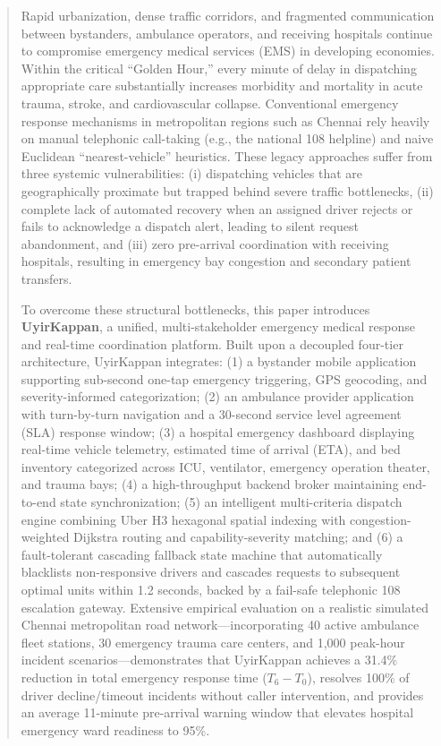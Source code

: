 \documentclass[conference]{IEEEtran}
\begin{document}
\begin{abstract}
Rapid urbanization, dense traffic corridors, and fragmented communication between bystanders, ambulance operators, and receiving hospitals continue to compromise emergency medical services (EMS) in developing economies. Within the critical ``Golden Hour,'' every minute of delay in dispatching appropriate care substantially increases morbidity and mortality in acute trauma, stroke, and cardiovascular collapse. Conventional emergency response mechanisms in metropolitan regions such as Chennai rely heavily on manual telephonic call-taking (e.g., the national 108 helpline) and naive Euclidean ``nearest-vehicle'' heuristics. These legacy approaches suffer from three systemic vulnerabilities: (i) dispatching vehicles that are geographically proximate but trapped behind severe traffic bottlenecks, (ii) complete lack of automated recovery when an assigned driver rejects or fails to acknowledge a dispatch alert, leading to silent request abandonment, and (iii) zero pre-arrival coordination with receiving hospitals, resulting in emergency bay congestion and secondary patient transfers.

To overcome these structural bottlenecks, this paper introduces \textbf{UyirKappan}, a unified, multi-stakeholder emergency medical response and real-time coordination platform. Built upon a decoupled four-tier architecture, UyirKappan integrates: (1) a bystander mobile application supporting sub-second one-tap emergency triggering, GPS geocoding, and severity-informed categorization; (2) an ambulance provider application with turn-by-turn navigation and a 30-second service level agreement (SLA) response window; (3) a hospital emergency dashboard displaying real-time vehicle telemetry, estimated time of arrival (ETA), and bed inventory categorized across ICU, ventilator, emergency operation theater, and trauma bays; (4) a high-throughput backend broker maintaining end-to-end state synchronization; (5) an intelligent multi-criteria dispatch engine combining Uber H3 hexagonal spatial indexing with congestion-weighted Dijkstra routing and capability-severity matching; and (6) a fault-tolerant cascading fallback state machine that automatically blacklists non-responsive drivers and cascades requests to subsequent optimal units within 1.2 seconds, backed by a fail-safe telephonic 108 escalation gateway. Extensive empirical evaluation on a realistic simulated Chennai metropolitan road network—incorporating 40 active ambulance fleet stations, 30 emergency trauma care centers, and 1,000 peak-hour incident scenarios—demonstrates that UyirKappan achieves a 31.4\% reduction in total emergency response time ($T_6 - T_0$), resolves 100\% of driver decline/timeout incidents without caller intervention, and provides an average 11-minute pre-arrival warning window that elevates hospital emergency ward readiness to 95\%.
\end{abstract}
\end{document}
